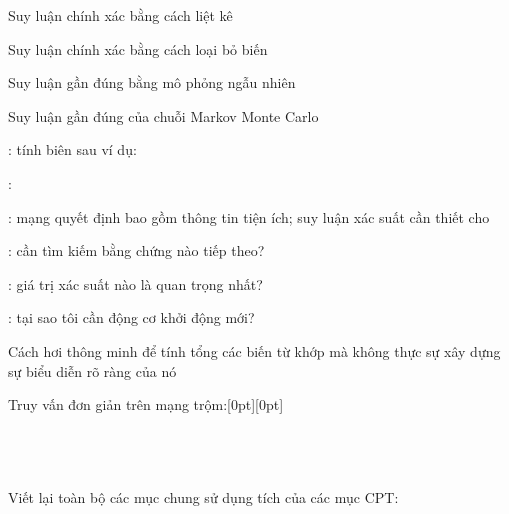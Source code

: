 \documentclass{article}
\begin{document}
\begin{huge}

\sf


\blob Suy luận chính xác bằng cách liệt kê

\blob Suy luận chính xác bằng cách loại bỏ biến

\blob Suy luận gần đúng bằng mô phỏng ngẫu nhiên

\blob Suy luận gần đúng của chuỗi Markov Monte Carlo



: tính biên sau \al
  ví dụ: 

: 

: mạng quyết định bao gồm thông tin tiện ích;\nl
    suy luận xác suất cần thiết cho 

: cần tìm kiếm bằng chứng nào tiếp theo?

: giá trị xác suất nào là quan trọng nhất?

: tại sao tôi cần động cơ khởi động mới?




Cách hơi thông minh để tính tổng các biến từ khớp
mà không thực sự xây dựng sự biểu diễn rõ ràng của nó

Truy vấn đơn giản trên mạng trộm:\hspace*{2.5in}\epsfxsize=1.5in\raisebox{-1.5in}[0pt][0pt]{}\\
\\
\\
\\

Viết lại toàn bộ các mục chung sử dụng tích của các mục CPT:\\
\\
\\
       

\end{huge}
\end{document}
